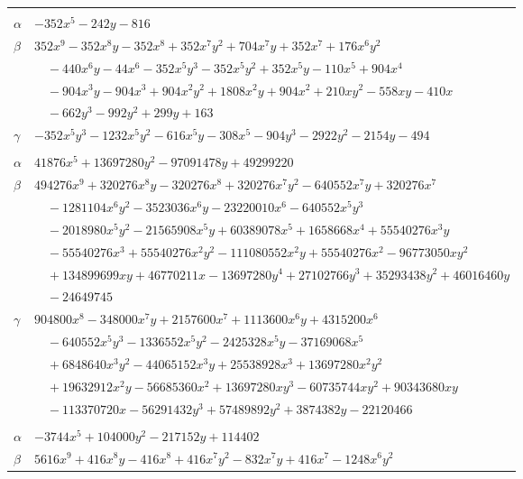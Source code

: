 \documentclass[11pt]{article}
\begin{document}
\begin{longtable}{@{}ll@{}}
\addlinespace[3pt]
\multicolumn{2}{@{}l}{$\{i,j\}=\{13,40\}$, $k_{ij}=2^{3}\cdot 3^{4}$}\\
$\alpha$ & $-352x^{5}-242y-816$\\
$\beta$ & $352x^{9}-352x^{8}y-352x^{8}+352x^{7}y^{2}+704x^{7}y+352x^{7}+176x^{6}y^{2}$\\
 & $\quad -440x^{6}y-44x^{6}-352x^{5}y^{3}-352x^{5}y^{2}+352x^{5}y-110x^{5}+904x^{4}$\\
 & $\quad -904x^{3}y-904x^{3}+904x^{2}y^{2}+1808x^{2}y+904x^{2}+210xy^{2}-558xy-410x$\\
 & $\quad -662y^{3}-992y^{2}+299y+163$\\
$\gamma$ & $-352x^{5}y^{3}-1232x^{5}y^{2}-616x^{5}y-308x^{5}-904y^{3}-2922y^{2}-2154y-494$\\
\addlinespace[3pt]
\multicolumn{2}{@{}l}{$\{i,j\}=\{14,20\}$, $k_{ij}=2\cdot 3^{3}\cdot 5$}\\
$\alpha$ & $41876x^{5}+13697280y^{2}-97091478y+49299220$\\
$\beta$ & $494276x^{9}+320276x^{8}y-320276x^{8}+320276x^{7}y^{2}-640552x^{7}y+320276x^{7}$\\
 & $\quad -1281104x^{6}y^{2}-3523036x^{6}y-23220010x^{6}-640552x^{5}y^{3}$\\
 & $\quad -2018980x^{5}y^{2}-21565908x^{5}y+60389078x^{5}+1658668x^{4}+55540276x^{3}y$\\
 & $\quad -55540276x^{3}+55540276x^{2}y^{2}-111080552x^{2}y+55540276x^{2}-96773050xy^{2}$\\
 & $\quad +134899699xy+46770211x-13697280y^{4}+27102766y^{3}+35293438y^{2}+46016460y$\\
 & $\quad -24649745$\\
$\gamma$ & $904800x^{8}-348000x^{7}y+2157600x^{7}+1113600x^{6}y+4315200x^{6}$\\
 & $\quad -640552x^{5}y^{3}-1336552x^{5}y^{2}-2425328x^{5}y-37169068x^{5}$\\
 & $\quad +6848640x^{3}y^{2}-44065152x^{3}y+25538928x^{3}+13697280x^{2}y^{2}$\\
 & $\quad +19632912x^{2}y-56685360x^{2}+13697280xy^{3}-60735744xy^{2}+90343680xy$\\
 & $\quad -113370720x-56291432y^{3}+57489892y^{2}+3874382y-22120466$\\
\addlinespace[3pt]
\multicolumn{2}{@{}l}{$\{i,j\}=\{14,23\}$, $k_{ij}=2\cdot 5^{4}$}\\
$\alpha$ & $-3744x^{5}+104000y^{2}-217152y+114402$\\
$\beta$ & $5616x^{9}+416x^{8}y-416x^{8}+416x^{7}y^{2}-832x^{7}y+416x^{7}-1248x^{6}y^{2}$\\

\end{longtable}
\end{document}

